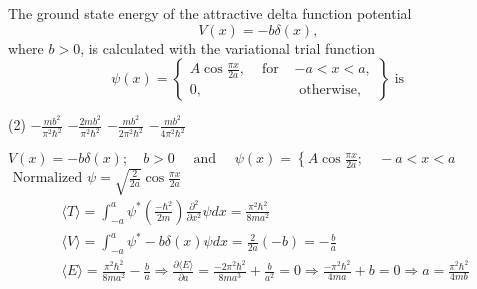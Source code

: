 \begin{enumerate}
\begin{minipage}{\textwidth}
	\item The ground state energy of the attractive delta function potential
	$$
	V(x)=-b \delta(x) \text {, }
	$$
	where $b>0$, is calculated with the variational trial function
	$$
	\psi(x)=\left\{\begin{array}{ccc}
	A \cos \frac{\pi x}{2 a}, & \text { for } & -a<x<a, \\
	0, & & \text { otherwise, }
	\end{array}\right\} \text { is }
	$$
	\exyear{NET DEC 2014}
\end{minipage}
\begin{tasks}(2)
	\task[\textbf{A.}] $-$
	\task[\textbf{B.}]$-$
	\task[\textbf{C.}]$-$
	\task[\textbf{D.}]$-$
\end{tasks}
\begin{answer}
	$V(x)=-b \delta(x) ; \quad b>0 \quad {} \quad \psi(x)=\left\{A \cos {} ; \quad-a<x<a\right.$\\
	$ \psi= \cos {}$\\
	$$\begin{aligned}
	&\langle T\rangle=\int_{-a}^{a} \psi^{*}\left(\frac{-\hbar^{2}}{2 m}\right) \frac{\partial^{2}}{\partial x^{2}} \psi d x=\frac{\pi^{2} \hbar^{2}}{8 m a^{2}} \\
	&\langle V\rangle=\int_{-a}^{a} \psi^{*}-b \delta(x) \psi d x=\frac{2}{2 a}(-b)=-\frac{b}{a} \\
	&\langle E\rangle=\frac{\pi^{2} \hbar^{2}}{8 m a^{2}}-\frac{b}{a} \Rightarrow \frac{\partial\langle E\rangle}{\partial a}=\frac{-2 \pi^{2} \hbar^{2}}{8 m a^{3}}+\frac{b}{a^{2}}=0 \Rightarrow \frac{-\pi^{2} \hbar^{2}}{4 m a}+b=0 \Rightarrow a=\frac{\pi^{2} \hbar^{2}}{4 m b}

\end{aligned}$$
\end{answer}
\end{enumerate}
